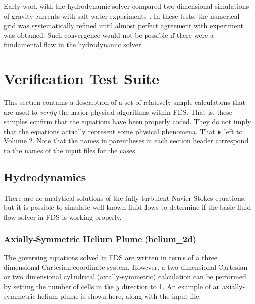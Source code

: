 \documentclass[11pt]{book}
\begin{document}
Early work with the hydrodynamic solver compared two-dimensional
simulations of gravity currents with salt-water
experiments~\cite{McGrattan:1}. In these tests, the numerical grid was
systematically refined until almost perfect agreement with experiment
was obtained. Such convergence would not be possible if there were a
fundamental flaw in the hydrodynamic solver.




\chapter{Verification Test Suite}
\label{verification_suite}

This section contains a description of a set of relatively simple
calculations that are used to {\em verify} the major physical
algorithms within FDS.  That is, these samples confirm that the
equations have been properly coded.  They do not imply that the
equations actually represent some physical phenomena.  That is left to Volume 2. Note that the names in parentheses in each section header
correspond to the names of the input files for the cases.



\section{Hydrodynamics}

There are no analytical solutions of the fully-turbulent Navier-Stokes equations, but it is possible to simulate well
known fluid flows to determine if the basic fluid flow solver in FDS is working properly.



\subsection{Axially-Symmetric Helium Plume ({\bf helium\_2d}) }

The governing equations solved in FDS are written in terms of a
three dimensional Cartesian coordinate system. However,
a two dimensional Cartesian or two dimensional cylindrical
(axially-symmetric) calculation can be performed by setting the number of
cells in the $y$ direction to 1.
An example of an axially-symmetric helium plume is shown here, along with the input file:
\end{document}
